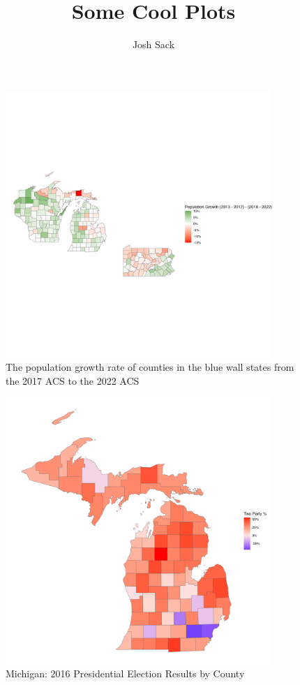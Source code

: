 \documentclass[11pt]{article}
\title{Some Cool Plots}
\author{Josh Sack}
\begin{document}
\maketitle 
\listoffigures
\begin{figure}
    \centering
    \includegraphics[width=0.9\textwidth]{plots/blue-wall-growth.png}
    \caption{The population growth rate of counties in the blue wall states from the 2017 ACS to the 2022 ACS}
\end{figure}
\begin{figure}
    \centering 
    \includegraphics[width=0.9\textwidth]{plots/county-results.png}
    \caption{Michigan: 2016 Presidential Election Results by County}
    \label{fig:2016-results}
\end{figure}
\end{document}
